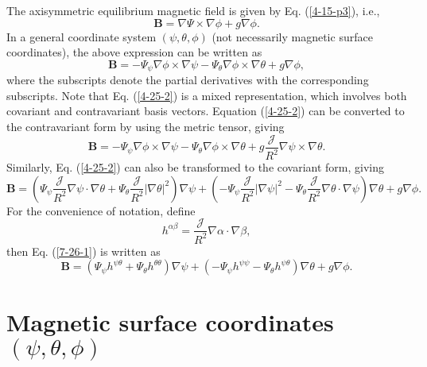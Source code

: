 \documentclass{llncs}
\begin{document}
The axisymmetric equilibrium magnetic field is given by Eq. (\ref{4-15-p3}),
i.e.,
\begin{equation}
  \label{4-25-1} \mathbf{B}= \nabla \Psi \times \nabla \phi + g \nabla \phi .
\end{equation}
In a general coordinate system $(\psi, \theta, \phi)$ (not necessarily
magnetic surface coordinates), the above expression can be written as
\begin{equation}
  \label{4-25-2} \mathbf{B}= - \Psi_{\psi} \nabla \phi \times \nabla \psi -
  \Psi_{\theta} \nabla \phi \times \nabla \theta + g \nabla \phi,
\end{equation}
where the subscripts denote the partial derivatives with the corresponding
subscripts. Note that Eq. (\ref{4-25-2}) is a mixed representation, which
involves both covariant and contravariant basis vectors. Equation
(\ref{4-25-2}) can be converted to the contravariant form by using the metric
tensor, giving
\begin{equation}
  \label{3-13-p10} \mathbf{B}= - \Psi_{\psi} \nabla \phi \times \nabla \psi -
  \Psi_{\theta} \nabla \phi \times \nabla \theta + g \frac{\mathcal{J}}{R^2}
  \nabla \psi \times \nabla \theta .
\end{equation}
Similarly, Eq. (\ref{4-25-2}) can also be transformed to the covariant form,
giving
\begin{equation}
  \label{7-26-1} \mathbf{B}= \left( \Psi_{\psi} \frac{\mathcal{J}}{R^2} \nabla
  \psi \cdot \nabla \theta + \Psi_{\theta} \frac{\mathcal{J}}{R^2} | \nabla
  \theta |^2 \right) \nabla \psi + \left( - \Psi_{\psi}
  \frac{\mathcal{J}}{R^2} | \nabla \psi |^2 - \Psi_{\theta}
  \frac{\mathcal{J}}{R^2} \nabla \theta \cdot \nabla \psi \right) \nabla
  \theta + g \nabla \phi .
\end{equation}
For the convenience of notation, define
\begin{equation}
  \label{4-25-e20} h^{\alpha \beta} = \frac{\mathcal{J}}{R^2} \nabla \alpha
  \cdot \nabla \beta,
\end{equation}
then Eq. (\ref{7-26-1}) is written as
\begin{equation}
  \label{4-16-1} \mathbf{B}= (\Psi_{\psi} h^{\psi \theta} + \Psi_{\theta}
  h^{\theta \theta}) \nabla \psi + (- \Psi_{\psi} h^{\psi \psi} -
  \Psi_{\theta} h^{\psi \theta}) \nabla \theta + g \nabla \phi .
\end{equation}

\section{Magnetic surface coordinates $(\psi, \theta, \phi)$}
\end{document}
